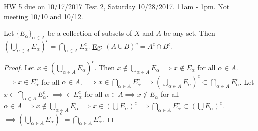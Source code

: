 \documentclass[]{article}
\begin{document}
\ul{HW 5 due on 10/17/2017} Test 2, Saturday 10/28/2017. 11am - 1pm. Not meeting 10/10 and 10/12.

\begin{theorem}
	Let $\{E_\alpha\}_{\alpha\in A}$ be a collection of subsets of $X$ and $A$ be any set.
	Then $\left( \bigcup_{\alpha\in A} E_\alpha\right)^c = \bigcap_{\alpha\in A} E_\alpha^c$. \ul{Eg}: $(A\cup B)^c = A^c\cap B^c$.
\end{theorem}
\begin{proof}
	\say{$\subset$} Let $x\in\left(\bigcup_{\alpha\in A} E_\alpha\right)^c$. Then $x\notin \bigcup_{\alpha\in A} E_\alpha \implies x \notin E_\alpha$  \ul{for all $\alpha\in A$}.
	$\implies x\in E_\alpha^c$ for all $\alpha\in A$. $\implies x\in \bigcap_{\alpha\in A} E_\alpha^c \implies \left(\bigcup_{\alpha\in A} E_\alpha\right)^c \subset \bigcap_{\alpha\in A} E_\alpha^c$.
	\say{$\supset$} Let $x\in \bigcap_{\alpha\in A} E_\alpha^c$. $\implies \in E_\alpha^c$ for all $\alpha \in A \implies x\notin E_\alpha$ for all $\alpha \in A \implies x\notin \bigcup_{\alpha\in A} E_\alpha \implies x\in\left( \bigcup E_\alpha \right)^c \implies \bigcap_{\alpha\in A} E_\alpha^c \subset(\bigcup E_\alpha )^c$.
	$\implies \left(\bigcup_{\alpha\in A}E_\alpha\right)^c = \bigcap_{\alpha\in A} E_\alpha^c$.
\end{proof}
\end{document}
